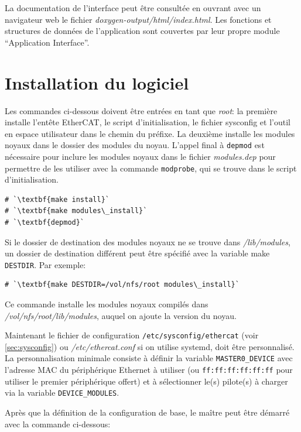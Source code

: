 \documentclass[a4paper,12pt,BCOR=6mm,bibtotoc,idxtotoc]{scrbook}
\begin{document}
La documentation de l'interface peut \^etre consult\'ee en ouvrant avec
un navigateur web le fichier \textit{doxygen-output/html/index.html}.
Les fonctions et structures de donn\'ees de l'application sont couvertes
par leur propre module ``Application Interface''.

\section{Installation du logiciel}

Les commandes ci-dessous doivent \^etre entr\'ees en tant que
\textit{root}: la premi\`ere installe l'ent\^ete EtherCAT, le script
d'initialisation, le fichier sysconfig et l'outil en espace
utilisateur dans le chemin du pr\'efixe.  La deuxi\`eme installe les
modules noyaux dans le dossier des modules du noyau.  L'appel final
\`a \lstinline+depmod+ est n\'ecessaire pour inclure les modules
noyaux dans le fichier \textit{modules.dep} pour permettre de les
utiliser avec la commande \lstinline+modprobe+, qui se trouve dans le
script d'initialisation.

\begin{lstlisting}
# `\textbf{make install}`
# `\textbf{make modules\_install}`
# `\textbf{depmod}`
\end{lstlisting}

Si le dossier de destination des modules noyaux ne se trouve dans
\textit{/lib/modules}, un dossier de destination diff\'erent peut \^etre
sp\'ecifi\'e avec la variable make \lstinline+DESTDIR+. Par exemple:

\begin{lstlisting}
# `\textbf{make DESTDIR=/vol/nfs/root modules\_install}`
\end{lstlisting}

Ce commande installe les modules noyaux compil\'es dans
\textit{/vol/nfs/root/lib/modules}, auquel on ajoute la version du
noyau.


Maintenant le fichier de configuration
\texttt{/etc/sysconfig/ethercat} (voir \autoref{sec:sysconfig}) ou
\textit{/etc/ethercat.conf} si on utilise systemd, doit \^etre
personnalis\'e.  La personnalisation minimale consiste \`a d\'efinir
la variable \lstinline+MASTER0_DEVICE+ avec l'adresse MAC du
p\'eriph\'erique Ethernet \`a utiliser (ou
\lstinline+ff:ff:ff:ff:ff:ff+ pour utiliser le premier
p\'eriph\'erique offert) et \`a s\'electionner le(s) pilote(s) \`a
charger via la variable \lstinline+DEVICE_MODULES+.

Apr\`es que la d\'efinition de la configuration de base, le ma\^itre
peut \^etre d\'emarr\'e avec la commande ci-dessous:
\end{document}
